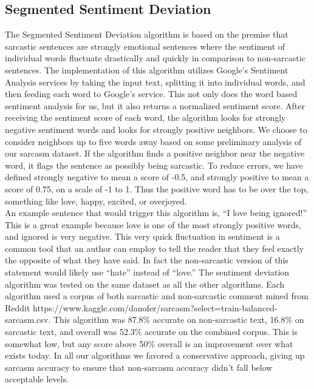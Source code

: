 \documentclass[conference]{IEEEtran}
\begin{document}
\subsection{Segmented Sentiment Deviation}
The Segmented Sentiment Deviation algorithm is based on the premise that sarcastic sentences are strongly emotional sentences where the sentiment of individual words fluctuate drastically and quickly in comparison to non-sarcastic sentences. The implementation of this algorithm utilizes Google’s Sentiment Analysis services by taking the input text, splitting it into individual words, and then feeding each word to Google’s service. This not only does the word based sentiment analysis for us, but it also returns a normalized sentiment score. After receiving the sentiment score of each word, the algorithm looks for strongly negative sentiment words and looks for strongly positive neighbors. We choose to consider neighbors up to five words away based on some preliminary analysis of our sarcasm dataset. If the algorithm finds a positive neighbor near the negative word, it flags the sentence as possibly being sarcastic. To reduce errors, we have defined strongly negative to mean a score of -0.5, and strongly positive to mean a score of 0.75, on a scale of -1 to 1. Thus the positive word has to be over the top, something like love, happy, excited, or overjoyed. \\
An example sentence that would trigger this algorithm is, “I love being ignored!” This is a great example because love is one of the most strongly positive words, and ignored is very negative. This very quick fluctuation in sentiment is a common tool that an author can employ to tell the reader that they feel exactly the opposite of what they have said. In fact the non-sarcastic version of this statement would likely use “hate” instead of “love.”  The sentiment deviation algorithm was tested on the same dataset as all the other algorithms. Each algorithm used a corpus of both sarcastic and non-sarcastic comment mined from Reddit https://www.kaggle.com/danofer/sarcasm?select=train-balanced-sarcasm.csv. This algorithm was 87.8\% accurate on non-sarcastic text, 16.8\% on sarcastic text, and overall was 52.3\% accurate on the combined corpus. This is somewhat low, but any score above 50\% overall is an improvement over what exists today. In all our algorithms we favored a conservative approach, giving up sarcasm accuracy to ensure that non-sarcasm accuracy didn’t fall below acceptable levels. \\
\end{document}
